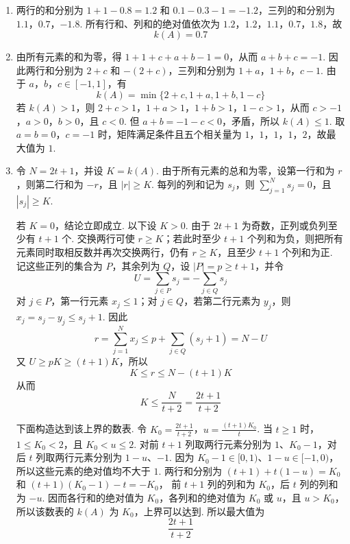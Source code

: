 \begin{solution}
\begin{enumerate}
\item 两行的和分别为 \(1+1-0.8=1.2\) 和 \(0.1-0.3-1=-1.2\)，三列的和分别为 \(1.1\)，\(0.7\)，\(-1.8\). 所有行和、列和的绝对值依次为 \(1.2\)，\(1.2\)，\(1.1\)，\(0.7\)，\(1.8\)，故
\[
k(A)=0.7
\]
\item 由所有元素的和为零，得 \(1+1+c+a+b-1=0\)，从而 \(a+b+c=-1\).
因此两行和分别为 \(2+c\) 和 \(-(2+c)\)，三列和分别为 \(1+a\)，\(1+b\)，\(c-1\). 由于 \(a\)，\(b\)，\(c\in[-1,1]\)，有
\[
k(A)=\min\{2+c,1+a,1+b,1-c\}
\]
若 \(k(A)>1\)，则 \(2+c>1\)，\(1+a>1\)，\(1+b>1\)，\(1-c>1\)，从而 \(c>-1\)，\(a>0\)，\(b>0\)，且 \(c<0\). 但 \(a+b=-1-c<0\)，矛盾，所以 \(k(A)\leqslant1\). 取 \(a=b=0\)，\(c=-1\) 时，矩阵满足条件且五个相关量为 \(1\)，\(1\)，\(1\)，\(1\)，\(2\)，故最大值为 \(1\).
\item 令 \(N=2t+1\)，并设 \(K=k(A)\). 由于所有元素的总和为零，设第一行和为 \(r\)，则第二行和为 \(-r\)，且 \(|r|\geqslant K\). 每列的列和记为 \(s_j\)，则 \(\sum_{j=1}^{N}s_j=0\)，且 \(|s_j|\geqslant K\).

若 \(K=0\)，结论立即成立. 以下设 \(K>0\). 由于 \(2t+1\) 为奇数，正列或负列至少有 \(t+1\) 个. 交换两行可使 \(r\geqslant K\)；若此时至少 \(t+1\) 个列和为负，则把所有元素同时取相反数并再次交换两行，仍有 \(r\geqslant K\)，且至少 \(t+1\) 个列和为正. 记这些正列的集合为 \(P\)，其余列为 \(Q\)，设 \(|P|=p\geqslant t+1\)，并令
\[
U=\sum_{j\in P}s_j=-\sum_{j\in Q}s_j
\]
对 \(j\in P\)，第一行元素 \(x_j\leqslant1\)；对 \(j\in Q\)，若第二行元素为 \(y_j\)，则 \(x_j=s_j-y_j\leqslant s_j+1\). 因此
\[
r=\sum_{j=1}^{N}x_j\leqslant p+\sum_{j\in Q}(s_j+1)=N-U
\]
又 \(U\geqslant pK\geqslant(t+1)K\)，所以
\[
K\leqslant r\leqslant N-(t+1)K
\]
从而
\[
K\leqslant\frac{N}{t+2}=\frac{2t+1}{t+2}
\]

下面构造达到该上界的数表. 令 \(K_0=\frac{2t+1}{t+2}\)，\(u=\frac{(t+1)K_0}{t}\). 当 \(t\geqslant1\) 时，\(1\leqslant K_0<2\)，且 \(K_0<u\leqslant2\).
对前 \(t+1\) 列取两行元素分别为 \(1\)、\(K_0-1\)，对后 \(t\) 列取两行元素分别为 \(1-u\)、\(-1\). 因为 \(K_0-1\in[0,1)\)、\(1-u\in[-1,0)\)，所以这些元素的绝对值均不大于 \(1\). 两行和分别为
\((t+1)+t(1-u)=K_0\) 和 \((t+1)(K_0-1)-t=-K_0\)，
前 \(t+1\) 列的列和为 \(K_0\)，后 \(t\) 列的列和为 \(-u\). 因而各行和的绝对值为 \(K_0\)，各列和的绝对值为 \(K_0\) 或 \(u\)，且 \(u>K_0\)，所以该数表的 \(k(A)\) 为 \(K_0\)，上界可以达到. 所以最大值为
\[
\frac{2t+1}{t+2}
\]
\end{enumerate}
\end{solution}
